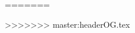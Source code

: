 \def\fullwidth#1{\vspace*{-0.2cm}\par\centerline{\texttt{[image: \#1]}}}
\def\fullheight#1{\vspace*{-0.2cm}\par\centerline{\texttt{[image: \#1]}}}
=======

\usepackage{multicol}
\usepackage{tabularx,ragged2e}
\usepackage{tikz}
\usetikzlibrary{mindmap,backgrounds}

\newcommand{\quoted}[1]{›#1‹}
>>>>>>> master:headerOG.tex
